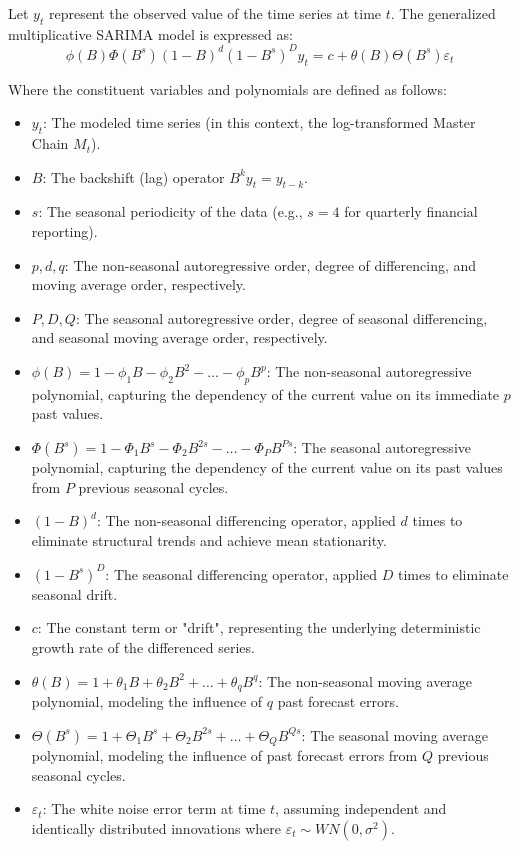 \begin{definition}
Let $y_t$ represent the observed value of the time series at time $t$. The generalized multiplicative SARIMA model is expressed as:
$$\phi(B)\Phi(B^s)(1-B)^d(1-B^s)^D y_t = c + \theta(B)\Theta(B^s)\varepsilon_t$$

Where the constituent variables and polynomials are defined as follows:
\begin{itemize}
\renewcommand{\labelitemi}{$-$}
    \item $y_t$: The modeled time series (in this context, the log-transformed Master Chain $M_t$).
    \item $B$: The backshift (lag) operator $B^k y_t = y_{t-k}$.
    \item $s$: The seasonal periodicity of the data (e.g., $s=4$ for quarterly financial reporting).
    \item $p, d, q$: The non-seasonal autoregressive order, degree of differencing, and moving average order, respectively.
    \item $P, D, Q$: The seasonal autoregressive order, degree of seasonal differencing, and seasonal moving average order, respectively.
    \item $\phi(B) = 1 - \phi_1 B - \phi_2 B^2 - \dots - \phi_p B^p$: The non-seasonal autoregressive polynomial, capturing the dependency of the current value on its immediate $p$ past values.
    \item $\Phi(B^s) = 1 - \Phi_1 B^s - \Phi_2 B^{2s} - \dots - \Phi_P B^{Ps}$: The seasonal autoregressive polynomial, capturing the dependency of the current value on its past values from $P$ previous seasonal cycles.
    \item $(1-B)^d$: The non-seasonal differencing operator, applied $d$ times to eliminate structural trends and achieve mean stationarity.
    \item $(1-B^s)^D$: The seasonal differencing operator, applied $D$ times to eliminate seasonal drift.
    \item $c$: The constant term or "drift", representing the underlying deterministic growth rate of the differenced series.
    \item $\theta(B) = 1 + \theta_1 B + \theta_2 B^2 + \dots + \theta_q B^q$: The non-seasonal moving average polynomial, modeling the influence of $q$ past forecast errors.
    \item $\Theta(B^s) = 1 + \Theta_1 B^s + \Theta_2 B^{2s} + \dots + \Theta_Q B^{Qs}$: The seasonal moving average polynomial, modeling the influence of past forecast errors from $Q$ previous seasonal cycles.
    \item $\varepsilon_t$: The white noise error term at time $t$, assuming independent and identically distributed innovations where $\varepsilon_t \sim WN(0, \sigma^2)$.
\end{itemize}
\end{definition}

